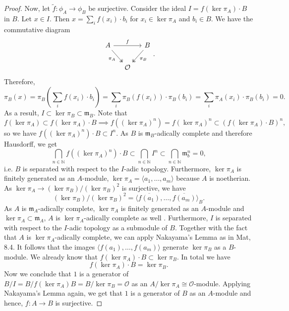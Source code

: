 \documentclass{article}
\theoremstyle{plain}%
\theoremstyle{definition}
\theoremstyle{remark}
\begin{document}
\begin{proof}
    Now, let \(\tilde f\colon \phi_A \to \phi_B\) be surjective. 
    Consider the ideal \(I = f(\ker \pi_A) \cdot B\) in \(B\).
    Let \(x \in I\). Then \(x = \sum_i f(x_i) \cdot b_i\) for \(x_i \in \ker \pi_A\) and \(b_i \in B\).
    We have the commutative diagram
    \[
    \begin{tikzcd}[column sep=small]
        A \arrow[rr, "f"] \arrow [dr, "\pi_A", swap, twoheadrightarrow] & & B \arrow [dl, "\pi_B", twoheadrightarrow]\\
        & \mathcal{O} &
    \end{tikzcd}.
    \]
    Therefore,
    \[
        \pi_B(x) = \pi_B\left(\sum_i f(x_i)\cdot b_i\right) 
        = \sum_i \pi_B(f(x_i))\cdot \pi_B(b_i) 
        = \sum_i\pi_A(x_i)\cdot \pi_B(b_i) = 0. 
    \]
    As a result, \(I \subset \ker \pi_B \subset \mathfrak{m}_B\).
    Note that
    \[
        f(\ker \pi_A) \subset f(\ker \pi_A)\cdot B \implies f((\ker \pi_A)^n) 
        = f(\ker \pi_A)^n \subset (f(\ker \pi_A)\cdot B)^n,
    \]
    so we have \(f((\ker \pi_A)^n)\cdot B \subset I^n\).
    As \(B\) is \(\mathfrak{m}_B\)-adically complete and therefore Hausdorff, we get
    \[
        \bigcap_{n \in \mathbb N} f((\ker \pi_A)^n) \cdot B \subset \bigcap_{n \in \mathbb N} I^n 
        \subset \bigcap_{n \in \mathbb N} \mathfrak{m}_b^n = 0,
    \]
    i.e. \(\!B\) is separated with respect to the \(I\)-adic topology.
    Furthermore, \(\ker \pi_A\) is finitely generated as an \(A\)-module, 
    \(\ker \pi_A = \langle a_1, \dots, a_m\rangle\) because \(A\) is noetherian. 
    As \(\ker \pi_A \to (\ker \pi_B)/(\ker \pi_B)^2\) is surjective, we have 
    \[(\ker \pi_B)/(\ker \pi_B)^2 = \langle \overline{f(a_1)}, \dots, \overline{f(a_m)}\rangle_B.\]
    As \(A\) is \(\mathfrak{m}_A\)-adically complete, \(\ker \pi_A\) is finitely generated as an \(A\)-module
    and \(\ker \pi_A \subset \mathfrak{m}_A\), \(A\) is \(\ker \pi_A\)-adically complete as well
    \cite[cf.][\href{https://stacks.math.columbia.edu/tag/090T}{tag 090T}]{stacks-project}.
    Furthermore, \(I\) is separated with respect to the \(I\)-adic topology 
    as a submodule of \(B\). Together with the fact that \(A\) is \(\ker \pi_A\)-adically complete,
    we can apply Nakayama's Lemma as in Mat, 8.4. 
    It follows that the images \(\langle f(a_1), \dots, f(a_m)\rangle\) generate \(\ker \pi_B\)
    as a \(B\)-module. We already know that \(f(\ker \pi_A) \cdot B \subset \ker \pi_B\). 
    In total we have
    \[
        f(\ker \pi_A) \cdot B = \ker \pi_B.
    \]
    Now we conclude that \(1\) is a generator of \(B/I = B/f(\ker \pi_A) B = B/\ker \pi_B = \mathcal{O}\) as an 
    \(A/\ker \pi_A \cong \mathcal{O}\)-module.
    Applying Nakayama's Lemma again, we get that \(1\) is a generator of \(B\) as an \(A\)-module 
    and hence, \(f\colon A \to B\) is surjective.
\end{proof}
\end{document}
